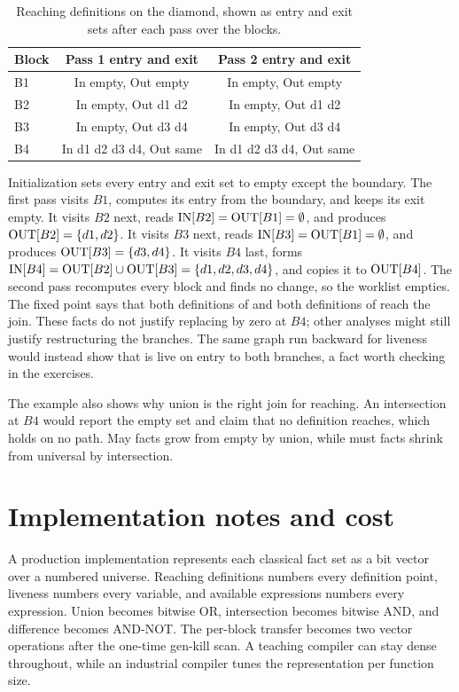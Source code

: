 \begin{table}
\caption{Reaching definitions on the diamond, shown as entry and exit sets after each pass over the blocks.}
\label{tab:ch09-reaching}
\begin{tabular}{lcc}
\toprule
Block & Pass 1 entry and exit & Pass 2 entry and exit \\
\midrule
B1 & In empty, Out empty & In empty, Out empty \\
B2 & In empty, Out d1 d2 & In empty, Out d1 d2 \\
B3 & In empty, Out d3 d4 & In empty, Out d3 d4 \\
B4 & In d1 d2 d3 d4, Out same & In d1 d2 d3 d4, Out same \\
\bottomrule
\end{tabular}
\end{table}

Initialization sets every entry and exit set to empty except the boundary.
The first pass visits $B1$, computes its entry from the boundary, and keeps its exit empty.
It visits $B2$ next, reads $\mathrm{IN}[B2] = \mathrm{OUT}[B1] = \emptyset$, and produces $\mathrm{OUT}[B2] = \{d1, d2\}$.
It visits $B3$ next, reads $\mathrm{IN}[B3] = \mathrm{OUT}[B1] = \emptyset$, and produces $\mathrm{OUT}[B3] = \{d3, d4\}$.
It visits $B4$ last, forms $\mathrm{IN}[B4] = \mathrm{OUT}[B2] \cup \mathrm{OUT}[B3] = \{d1, d2, d3, d4\}$, and copies it to $\mathrm{OUT}[B4]$.
The second pass recomputes every block and finds no change, so the worklist empties.
The fixed point says that both definitions of  and both definitions of  reach the join.
These facts do not justify replacing  by zero at $B4$; other analyses might still justify restructuring the branches.
The same graph run backward for liveness would instead show that  is live on entry to both branches, a fact worth checking in the exercises.

The example also shows why union is the right join for reaching.
An intersection at $B4$ would report the empty set and claim that no definition reaches, which holds on no path.
May facts grow from empty by union, while must facts shrink from universal by intersection.

\section{Implementation notes and cost}
\label{sec:ch09-implementation}

A production implementation represents each classical fact set as a bit vector over a numbered universe.
Reaching definitions numbers every definition point, liveness numbers every variable, and available expressions numbers every expression.
Union becomes bitwise OR, intersection becomes bitwise AND, and difference becomes AND-NOT.
The per-block transfer becomes two vector operations after the one-time gen-kill scan.
A teaching compiler can stay dense throughout, while an industrial compiler tunes the representation per function size.

